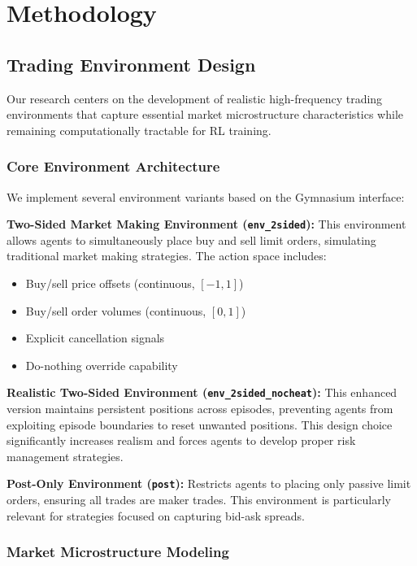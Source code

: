 \documentclass[conference]{IEEEtran}
\begin{document}
\section{Methodology}

\subsection{Trading Environment Design}

Our research centers on the development of realistic high-frequency trading environments that capture essential market microstructure characteristics while remaining computationally tractable for RL training.

\subsubsection{Core Environment Architecture}

We implement several environment variants based on the Gymnasium interface:

\textbf{Two-Sided Market Making Environment (\texttt{env\_2sided}):} This environment allows agents to simultaneously place buy and sell limit orders, simulating traditional market making strategies. The action space includes:
\begin{itemize}
\item Buy/sell price offsets (continuous, $[-1, 1]$)
\item Buy/sell order volumes (continuous, $[0, 1]$)
\item Explicit cancellation signals
\item Do-nothing override capability
\end{itemize}

\textbf{Realistic Two-Sided Environment (\texttt{env\_2sided\_nocheat}):} This enhanced version maintains persistent positions across episodes, preventing agents from exploiting episode boundaries to reset unwanted positions. This design choice significantly increases realism and forces agents to develop proper risk management strategies.

\textbf{Post-Only Environment (\texttt{post}):} Restricts agents to placing only passive limit orders, ensuring all trades are maker trades. This environment is particularly relevant for strategies focused on capturing bid-ask spreads.

\subsubsection{Market Microstructure Modeling}
\end{document}
